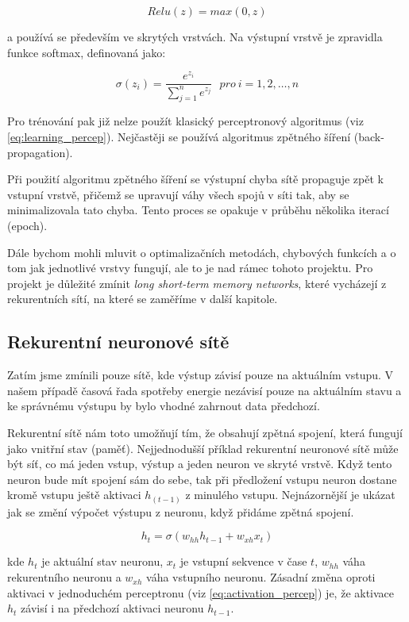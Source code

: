\documentclass[FM,BP,fonts]{tulthesis}
\begin{document}
\begin{equation}
	Relu(z) = max(0, z)
\end{equation}

a používá se především ve skrytých vrstvách. \cite{brownlee2019gentle} Na výstupní vrstvě je zpravidla funkce softmax, definovaná jako:

\begin{equation}
	\sigma(z_i) = \frac{e^{z_{i}}}{\sum_{j=1}^n e^{z_{j}}} \ \ \ pro\ i=1,2,\dots,n
\end{equation}

Pro trénování pak již nelze použít klasický perceptronový algoritmus (viz \ref{eq:learning_percep}). Nejčastěji se používá algoritmus zpětného šíření (back-propagation).

Při použití algoritmu zpětného šíření se výstupní chyba sítě propaguje zpět k vstupní vrstvě, přičemž se upravují váhy všech spojů v síti tak, aby se minimalizovala tato chyba. Tento proces se opakuje v průběhu několika iterací (epoch).

Dále bychom mohli mluvit o optimalizačních metodách, chybových funkcích a o tom jak jednotlivé vrstvy fungují, ale to je nad rámec tohoto projektu. Pro projekt je důležité zmínit \textit{long short-term memory networks}, které vycházejí z rekurentních sítí, na které se zaměříme v další kapitole.


\subsection{Rekurentní neuronové sítě}
Zatím jsme zmínili pouze sítě, kde výstup závisí pouze na aktuálním vstupu. V našem případě časová řada spotřeby energie nezávisí pouze na aktuálním stavu a ke správnému výstupu by bylo vhodné zahrnout data předchozí.

Rekurentní sítě nám toto umožňují tím, že obsahují zpětná spojení, která fungují jako vnitřní stav (paměť). Nejjednodušší příklad rekurentní neuronové sítě může být síť, co má jeden vstup, výstup a jeden neuron ve skryté vrstvě. Když tento neuron bude mít spojení sám do sebe, tak při předložení vstupu neuron dostane kromě vstupu ještě aktivaci $h_{(t-1)}$ z minulého vstupu. Nejnázornější je ukázat jak se změní výpočet výstupu z neuronu, když přidáme zpětná spojení.


\begin{equation}
	h_t = \sigma(w_{hh}h_{t-1} + w_{xh}x_t)
\end{equation}

kde $h_t$ je aktuální stav neuronu, $x_t$ je vstupní sekvence v čase $t$, $w_{hh}$ váha rekurentního neuronu a $w_{xh}$ váha vstupního neuronu. Zásadní změna oproti aktivaci v jednoduchém perceptronu (viz \ref{eq:activation_percep})  je, že aktivace $h_t$ závisí i na předchozí aktivaci neuronu $h_{t-1}$.
\end{document}
